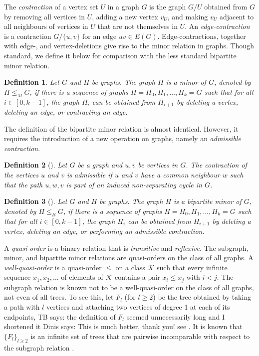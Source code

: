 \documentclass[a4paper,preprint,12pt]{elsarticle}
\newcommand{\therese}[1]{{\color{brown} TB says: #1}}
\newcommand{\dinis}[1]{{\color{blue} Dinis says: #1}}
\newcommand{\therese}[1]{}
\newcommand{\dinis}[1]{}
\newtheorem{definition}{Definition}
\newcommand{\bipMinorOf}{\leq_{B}}
\newcommand{\minorOf}{\leq_{M}}
\begin{document}
The \emph{contraction} of a vertex set $U$ in a graph $G$ is the graph $G/U$ obtained from $G$ by removing all vertices in $U$, adding a new vertex $v_U$, and making $v_U$ adjacent to all neighbours of vertices in $U$ that are not themselves in $U$.
An \emph{edge-contraction} is a contraction $G/\{u,v\}$ for an edge $uv\in E(G)$.
Edge-contractions, together with edge-, and vertex-deletions give rise to the minor relation in graphs.
Though standard, we define it below for comparison with the less standard bipartite minor relation.
\begin{definition}
    Let $G$ and $H$ be graphs.
    The graph $H$ is a \emph{minor} of $G$, denoted by $H\minorOf G$, if there is a sequence of graphs $H=H_0,H_1,\dots,H_k=G$ such that for all $i\in[0,k-1]$, the graph $H_i$ can be obtained from $H_{i+1}$ by deleting a vertex, deleting an edge, or contracting an edge.
\end{definition}
The definition of the bipartite minor relation is almost identical.
However, it requires the introduction of a new operation on graphs, namely an \emph{admissible contraction}.
\begin{definition}[{\cite[p. 221]{bipartiteMinors}}]
    Let $G$ be a graph and $u,v$ be vertices in $G$.
    The contraction of the vertices $u$ and $v$ is \emph{admissible} if $u$ and $v$ have a common neighbour $w$ such that the path $u,w,v$ is part of an induced non-separating cycle in $G$.
\end{definition}

\begin{definition}[{\cite[p. 221]{bipartiteMinors}}]
    Let $G$ and $H$ be graphs.
    The graph $H$ is a \emph{bipartite minor} of $G$, denoted by $H\bipMinorOf G$, if there is a sequence of graphs $H=H_0,H_1,\dots,H_k=G$ such that for all $i\in[0,k-1]$, the graph $H_i$ can be obtained from $H_{i+1}$ by deleting a vertex, deleting an edge, or performing an admissible contraction.
\end{definition}

A \emph{quasi-order} is a binary relation that is \emph{transitive} and \emph{reflexive}.
The subgraph, minor, and bipartite minor relations are quasi-orders on the class of all graphs.
A \emph{well-quasi-order} is a quasi-order $\leq$ on a class $\mathcal{K}$ such that every infinite sequence $x_{1},x_2,\dots$ of elements of $\mathcal{K}$ contains a pair $x_i\leq x_j$ with $i<j$.
The subgraph relation is known not to be a well-quasi-order on the class of all graphs, not even of all trees.
To see this, let $F_l$ (for $l\geq 2$) be the tree obtained by taking a path with $l$ vertices and attaching two vertices of degree 1 at each of its endpoints, \therese{the definition of $F_l$ seemed unnecessarily long and I shortened it}
\dinis{This is much better, thank you!}
see .
It is known that $\{F_l\}_{l\geq 2}$ is an infinite set of trees that are pairwise incomparable with respect to the subgraph relation \cite{forks}.
\end{document}
